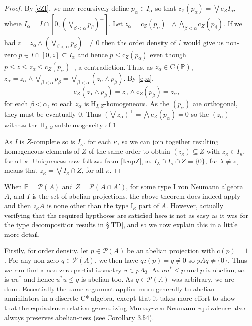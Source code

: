 \documentclass{amsart}
\theoremstyle{definition}
\numberwithin{equation}{section}
\begin{document}
\begin{proof}
By \autoref{cZI}, we may recursively define $p_\alpha\in I_\alpha$ so that $\mathrm{c}_Z(p_\alpha)=\bigvee\mathrm{c}_ZI_\alpha$, where $I_\alpha=I\cap[0,(\bigvee_{\beta<\alpha}p_\beta)^\perp]$.  Let $z_\alpha=\mathrm{c}_Z(p_\alpha)^\perp\wedge\bigwedge_{\beta<\alpha}\mathrm{c}_Z(p_\beta)$.  If we had $z=z_\alpha\wedge(\bigvee_{\beta<\alpha}p_\beta)^\perp\neq0$ then the order density of $I$ would give us non-zero $p\in I\cap[0,z]\subseteq I_\alpha$ and hence $p\leq\mathrm{c}_Z(p_\alpha)$ even though $p\leq z\leq z_\alpha\leq\mathrm{c}_Z(p_\alpha)^\perp$, a contradiction.  Thus, as $z_\alpha\in\mathrm{C}(\mathbb{P})$, $z_\alpha=z_\alpha\wedge\bigvee_{\beta<\alpha}p_\beta=\bigvee_{\beta<\alpha}(z_\alpha\wedge p_\beta)$.  By \eqref{cpz}, \[\mathrm{c}_Z(z_\alpha\wedge p_\beta)=z_\alpha\wedge\mathrm{c}_Z(p_\beta)=z_\alpha,\] for each $\beta<\alpha$, so each $z_\alpha$ is $\mathrm{H}_{I,Z}$-homogeneous.  As the $(p_\alpha)$ are orthogonal, they must be eventually $0$.  Thus $(\bigvee z_\alpha)^\perp=\bigwedge\mathrm{c}_Z(p_\alpha)=0$ so the $(z_\alpha)$ witness the $\mathrm{H}_{I,Z}$-subhomogeneity of $1$.

As $I$ is $Z$-complete so is $I_\kappa$, for each $\kappa$, so we can join together resulting homogeneous elements of $Z$ of the same order to obtain $(z_\kappa)\subseteq Z$ with $z_\kappa\in I_\kappa$, for all $\kappa$.  Uniqueness now follows from \autoref{IcapZ}, as $I_\lambda\cap I_\kappa\cap Z=\{0\}$, for $\lambda\neq\kappa$, means that $z_\kappa=\bigvee I_\kappa\cap Z$, for all $\kappa$.
\end{proof}

When $\mathbb{P}=\mathcal{P}(A)$ and $Z=\mathcal{P}(A\cap A')$, for some type $\mathrm{I}$ von Neumann algebra $A$, and $I$ is the set of abelian projections, the above theorem does indeed apply and then $z_\kappa A$ is none other than the type $\mathrm{I}_\kappa$ part of $A$.  However, actually verifying that the required hypthoses are satisfied here is not as easy as it was for the type decomposition results in \S\ref{TD}, and so we now explain this in a little more detail.

Firstly, for order density, let $p\in\mathcal{P}(A)$ be an abelian projection with $\mathrm{c}(p)=1$.  For any non-zero $q\in\mathcal{P}(A)$, we then have $q\mathrm{c}(p)=q\neq0$ so $pAq\neq\{0\}$.  Thus we can find a non-zero partial isometry $u\in pAq$.  As $uu^*\leq p$ and $p$ is abelian, so is $uu^*$ and hence $u^*u\leq q$ is abelian too.  As $q\in\mathcal{P}(A)$ was arbitrary, we are done.  Essentially the same argument applies more generally to abelian annihilators in a discrete C*-algebra, except that it takes more effort to show that the equivalence relation generalizing Murray-von Neumann equivalence also always preserves abelian-ness (see \cite{Bice2014} Corollary 3.54).
\end{document}
